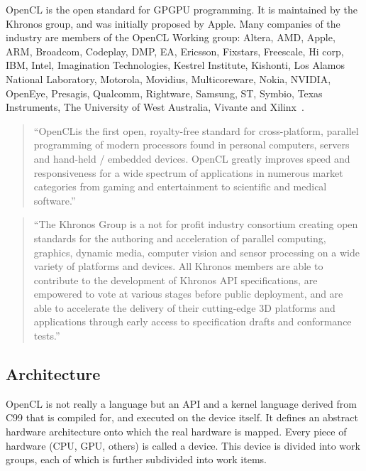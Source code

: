 \Gls{OpenCL} is the open standard for \gls{GPGPU} programming. It is maintained by the Khronos group, and was initially proposed by Apple. Many companies of the industry are members of the \gls{OpenCL} Working group: Altera, AMD, Apple, ARM, Broadcom, Codeplay, DMP, EA, Ericsson, Fixstars, Freescale, Hi corp, IBM, Intel, Imagination Technologies, Kestrel Institute, Kishonti, Los Alamos National Laboratory, Motorola, Movidius, Multicoreware, Nokia, NVIDIA, OpenEye, Presagis, Qualcomm, Rightware, Samsung, ST, Symbio, Texas Instruments, The University of West Australia, Vivante and Xilinx~\cite{opencl}.
\begin{quotation}
``OpenCL\texttrademark is the first open, royalty-free standard for cross-platform, parallel programming of modern processors found in personal computers, servers and hand-held / embedded devices. \gls{OpenCL} greatly improves speed and responsiveness for a wide spectrum of applications in numerous market categories from gaming and entertainment to scientific and medical software.''~\cite{opencl}
\end{quotation}
\begin{quotation}
``The Khronos Group is a not for profit industry consortium creating open standards for the authoring and acceleration of parallel computing, graphics, dynamic media, computer vision and sensor processing on a wide variety of platforms and devices. All Khronos members are able to contribute to the development of Khronos \gls{API} specifications, are empowered to vote at various stages before public deployment, and are able to accelerate the delivery of their cutting-edge 3D platforms and applications through early access to specification drafts and conformance tests.''~\cite{khronos}
\end{quotation}

\subsection{Architecture}

\gls{OpenCL} is not really a language but an \gls{API} and a kernel language derived from C99 that is compiled for, and executed on the device itself. It defines an abstract hardware architecture onto which the real hardware is mapped. Every piece of hardware (\gls{CPU}, \gls{GPU}, others) is called a device. This device is divided into work groups, each of which is further subdivided into work items.

